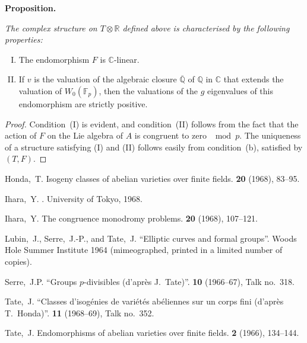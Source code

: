 \documentclass{article}
\newcommand{\FF}{\mathbb{F}}
\newcommand{\QQ}{\mathbb{Q}}
\newcommand{\RR}{\mathbb{R}}
\newcommand{\CC}{\mathbb{C}}
\newcommand{\oldpage}[1]{\marginpar{\footnotesize$\Big\vert$ \textit{p.~#1}}}
\begin{document}
\textbf{Proposition.}
{\itshape
  The complex structure on $T\otimes\RR$ defined above is characterised by the following properties:
  \begin{enumerate}[(I)]
    \item The endomorphism $F$ is $\CC$-linear.
    \item If $v$ is the valuation of the algebraic closure $\overline{\QQ}$ of $\QQ$ in $\CC$ that extends the valuation of $W_0(\FF_p)$, then the valuations of the $g$ eigenvalues of this endomorphism are strictly positive.
  \end{enumerate}
}

\begin{proof}
  Condition~(I) is evident, and condition~(II) follows from the fact that the action of $F$ on the Lie algebra of $A$ is congruent to zero $\mod p$.
  The uniqueness of a structure satisfying (I) and (II) follows easily from condition~(b), satisfied by $(T,F)$.
\end{proof}

\oldpage{243}


\nocite{*}

\begin{thebibliography}{7}

  {Honda,~T.}
  \newblock Isogeny classes of abelian varieties over finite fields.
   \textbf{20} (1968), 83--95.

  {Ihara,~Y.}
  .
  \newblock University of Tokyo, 1968.

  {Ihara,~Y.}
  \newblock The congruence monodromy problems.
   \textbf{20} (1968), 107--121.

  {Lubin,~J., Serre,~J.-P., and Tate,~J.}
  \newblock ``Elliptic curves and formal groups''.
  \newblock Woods Hole Summer Institute 1964 (mimeographed, printed in a limited number of copies).

  {Serre,~J.P.}
  \newblock ``Groups $p$-divisibles (d'apr\`{e}s J.~Tate)''.
   \textbf{10} (1966--67), Talk no.~318.

  {Tate,~J.}
  \newblock ``Classes d'isog\'{e}nies de vari\'{e}t\'{e}s ab\'{e}liennes sur un corps fini (d'apr\`{e}s T.~Honda)''.
   \textbf{11} (1968--69), Talk no.~352.

  {Tate,~J.}
  \newblock Endomorphisms of abelian varieties over finite fields.
   \textbf{2} (1966), 134--144.

\end{thebibliography}
\end{document}
